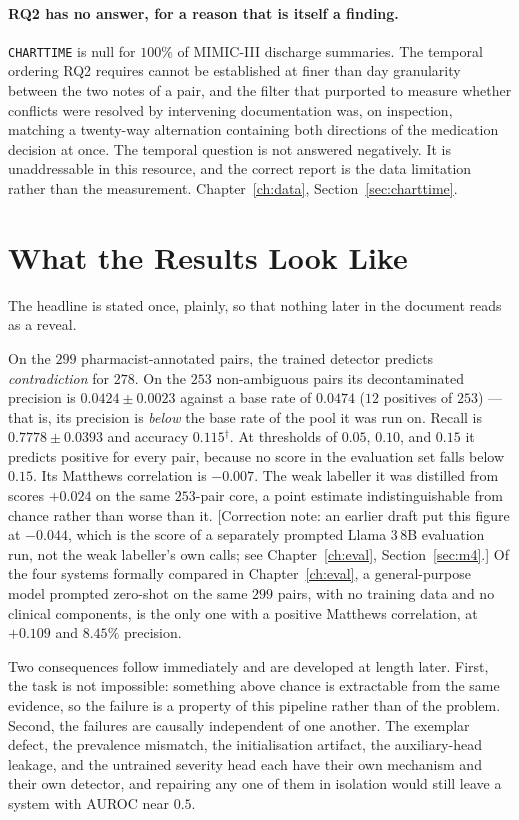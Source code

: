 \paragraph{RQ2 has no answer, for a reason that is itself a finding.}
\texttt{CHARTTIME} is null for $100\%$ of MIMIC-III discharge summaries. The
temporal ordering RQ2 requires cannot be established at finer than day
granularity between the two notes of a pair, and the filter that purported to
measure whether conflicts were resolved by intervening documentation was, on
inspection, matching a twenty-way alternation containing both directions of the
medication decision at once. The temporal question is not answered negatively.
It is unaddressable in this resource, and the correct report is the data
limitation rather than the measurement. Chapter~\ref{ch:data},
Section~\ref{sec:charttime}.

\section{What the Results Look Like}
\label{sec:intro-results}

The headline is stated once, plainly, so that nothing later in the document
reads as a reveal.

On the $299$ pharmacist-annotated pairs, the trained detector predicts
\emph{contradiction} for $278$. On the $253$ non-ambiguous pairs its
decontaminated precision is $0.0424 \pm 0.0023$ against a base rate of
$0.0474$ ($12$ positives of $253$) --- that is, its precision is \emph{below}
the base rate of the pool it was run on. Recall is $0.7778 \pm 0.0393$ and
accuracy $0.115$$^{\dagger}$. At thresholds of $0.05$,
$0.10$, and $0.15$ it predicts positive for every pair, because no score in the
evaluation set falls below $0.15$. Its Matthews correlation is $-0.007$. The
weak labeller it was distilled from scores $+0.024$ on the same $253$-pair
core, a point estimate indistinguishable from chance rather than worse than
it. [Correction note: an earlier draft put this figure at $-0.044$, which is
the score of a separately prompted Llama 3\,8B evaluation run, not the weak
labeller's own calls; see Chapter~\ref{ch:eval}, Section~\ref{sec:m4}.] Of the
four systems formally compared in Chapter~\ref{ch:eval}, a general-purpose
model prompted zero-shot on the same $299$ pairs, with no training data and no
clinical components, is the only one with a positive Matthews correlation, at
$+0.109$ and $8.45\%$ precision.

Two consequences follow immediately and are developed at length later. First,
the task is not impossible: something above chance is extractable from the same
evidence, so the failure is a property of this pipeline rather than of the
problem. Second, the failures are causally independent of one another. The
exemplar defect, the prevalence mismatch, the initialisation artifact, the
auxiliary-head leakage, and the untrained severity head each have their own
mechanism and their own detector, and repairing any one of them in isolation
would still leave a system with AUROC near $0.5$.

